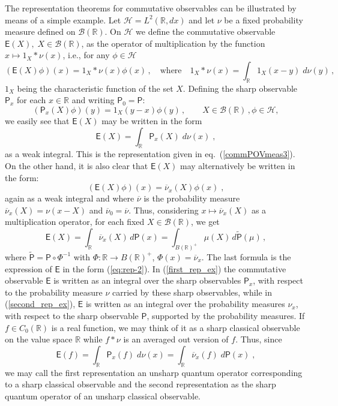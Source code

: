 \documentclass[12pt]{amsart}
\theoremstyle{definition}
\newcommand{\R}{\mathbb R} %
\newcommand{\hi}{\mathcal{H}} %
\newcommand{\Eo}{\mathsf{E}} %
\newcommand{\PP}{\mathsf{P}} %
\newcommand{\bor}[1]{\mathcal{B}(#1)} %
\newcommand{\de}{\, d}
\newcommand{\frecc}{\rightarrow}
\begin{document}
The representation theorems for commutative observables can be illustrated by
means of a simple example. Let $\hi = L^2(\R, dx )$ and let $\nu$ be a fixed probability
measure defined on $\bor\R$. On $\hi$ we define the commutative observable
$\Eo (X), \; X \in \bor\R$, as the operator of multiplication by the function $x \mapsto
1_X * \nu (x)$, i.e., for any $\phi \in \hi$
\begin{equation*}
(\Eo (X)\phi )(x) = 1_X * \nu (x) \phi (x) \, , \quad \text{where} \quad
    1_X * \nu (x) = \int_\R 1_X (x - y )\; d\nu (y) \, ,
\end{equation*}
$1_X$ being the characteristic function of the set $X$. Defining the sharp observable $\PP_x$ for each $x \in \R$ and writing $\PP_0  = \PP$:
\begin{equation*}
(\PP_x (X) \phi)(y) = 1_X (y - x )\phi (y)\, , \qquad X \in\bor\R\, ,
\phi \in \hi,
\end{equation*}
we easily see that $\Eo (X)$ may be written in the form
\begin{equation}
\Eo (X) = \int_\R \PP_x (X) \;d\nu (x)\; ,
\label{first_rep_ex}
\end{equation}
as a weak integral. This is the representation given in eq.~(\ref{commPOVmeas3}).
On the other hand, it is also clear that $\Eo (X)$ may alternatively be
written in the form:
\begin{equation*}
(\Eo (X)\phi )(x) = \overline{\nu}_x (X) \phi (x)\; ,
\end{equation*}
again as a weak integral and
where $\overline{\nu}$ is the probability measure $\overline{\nu}_x  (X) =
\nu (x - X)$ and $\overline{\nu}_0 = \overline{\nu}$. Thus,
considering $x\mapsto \overline{\nu}_x (X)$ as a multiplication operator, for each
fixed $X \in \bor\R$, we get
\begin{equation} \label{second_rep_ex}
\Eo (X) = \int_\R \overline{\nu}_x (X) \de \PP (x) = \int_{B(\R)^+} \mu (X) \de \tilde{\PP} (\mu) \, ,
 \end{equation}
where $\tilde{\PP} = \PP \circ \Phi^{-1}$ with $\Phi : \R \frecc B(\R)^+$, $\Phi (x) = \overline{\nu}_x$. The last formula is the expression of $\Eo$ in the form (\ref{eq:rep-2}).
In (\ref{first_rep_ex}) the commutative observable $\Eo$ is written as an integral
over the sharp observables $\PP_x$, with respect to the probability measure $\nu$ carried by these sharp observables, while in (\ref{second_rep_ex}), $\Eo$ is written as an integral over the probability measures $\nu_x$, with respect to the sharp observable $\PP$, supported by the probability measures. If $f \in C_0 (\R)$ is a real function, we may think of it as
a sharp classical observable on the value space $\R$ while $f*\nu$ is an averaged out
version of $f$. Thus, since
\begin{equation*}
\Eo (f) = \int_\R \PP_x (f) \;d\nu (x) = \int_\R \overline{\nu}_x (f)\; d\PP (x)\; ,
\end{equation*}
we may call the first representation an unsharp quantum operator corresponding to a
sharp classical observable and the second representation as the sharp quantum operator of an unsharp classical observable.
\end{document}
